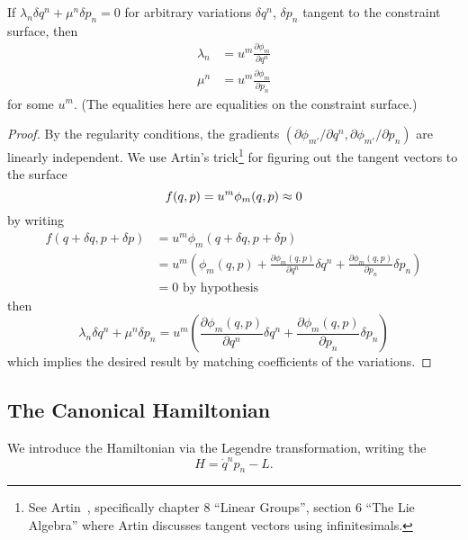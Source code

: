 \begin{theorem}\label{thm:variation-tangent-to-constraint-surface}
If $\lambda_{n}\delta q^{n} + \mu^{n}\delta p_{n}=0$ for arbitrary
variations $\delta q^{n}$, $\delta p_{n}$ tangent to the constraint
surface, then
\begin{equation}
  \begin{split}
    \lambda_{n} &= u^{m}\frac{\partial\phi_{m}}{\partial q^{n}}\\
    \mu^{n} &= u^{m}\frac{\partial\phi_{m}}{\partial p_{n}}
  \end{split}
\end{equation}
for some $u^{m}$. (The equalities here are equalities on the constraint
surface.) 
\end{theorem}
\begin{proof}
By the regularity conditions, the gradients $(\partial\phi_{m'}/\partial
q^{n},\partial\phi_{m'}/\partial p_{n})$ are linearly independent.
We use Artin's trick\footnote{See Artin~\cite{artin1991}, specifically
chapter 8 ``Linear Groups'', section 6 ``The Lie Algebra'' where Artin
discusses tangent vectors using infinitesimals.} for figuring out the
tangent vectors to the surface
\begin{equation}
f(q,p) = u^{m}\phi_{m}(q,p)\approx 0
\end{equation}
by writing
\begin{subequations}
\begin{align}
f(q+\delta q, p+\delta p) &= u^{m}\phi_{m}(q+\delta q, p+\delta p)\\
&=u^{m}\left(\phi_{m}(q,p)
             + \frac{\partial\phi_{m}(q,p)}{\partial q^{n}}\delta q^{n}
             + \frac{\partial\phi_{m}(q,p)}{\partial p_{n}}\delta p_{n}\right)\\
&=0\mbox{ by hypothesis}
\end{align}
\end{subequations}
then
\begin{equation}
\lambda_{n}\delta q^{n}+\mu^{n}\delta p_{n}
=u^{m}\left(\frac{\partial\phi_{m}(q,p)}{\partial q^{n}}\delta q^{n}
            + \frac{\partial\phi_{m}(q,p)}{\partial p_{n}}\delta p_{n}\right)
\end{equation}
which implies the desired result by matching coefficients of the variations.
\end{proof}


\subsection{The Canonical Hamiltonian}
\begin{definition}
We introduce the Hamiltonian via the Legendre transformation, writing
the 
\begin{equation}
H = \dot{q}^{n}p_{n} - L.
\end{equation}
\end{definition}

